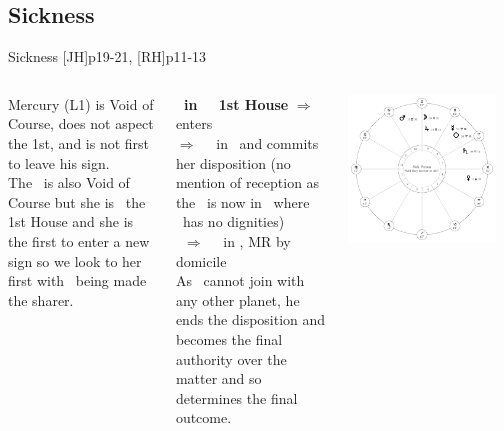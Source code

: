 \subsection{Sickness}
\begin{frame}[t]{Sickness [JH]p19-21, [RH]p11-13 }

\begin{columns}[T, onlytextwidth]
Mercury (L1) is Void of Course, does not aspect the 1st, and is not first to leave his sign. \\
\vspace{0.2cm}
The \Moon\ is also Void of Course but she is \Trine\ the 1st House and she is the first to enter a new sign so we look to her first with \Mercury\ being made the sharer. \\
\vspace{0.2cm}

\textbf{\Moon\ in \Taurus\ \Trine\ 1st House} $\Rightarrow$ enters \Gemini \\
$\Rightarrow$ \Square\ \Venus\ in \Pisces\ and commits her disposition (no mention of reception as the \Moon\ is now in \Gemini\ where \Venus\ has no dignities) \\
\Venus\ $\Rightarrow$ \Sextile\ \Jupiter\ in \Taurus, MR by domicile \\
\vspace{0.2cm}
As \Jupiter\ cannot join with any other planet\footnotemark[1], he ends the disposition and becomes the final authority over the matter and so determines the final outcome.
\vspace{0.2cm}

\begin{center}
{\includegraphics[width=0.9\textwidth]{charts/21-chart-sickness}} \\
\vspace{-0.2cm}
\end{center}
\end{columns}
\end{frame}

